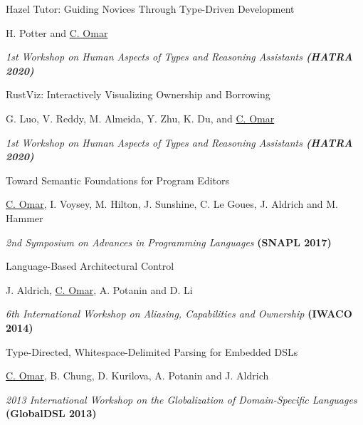 \documentclass[10pt,letterpaper]{article}
\renewenvironment{itemize}{
  \begin{list}{}{
    \setlength{\leftmargin}{1.25em}
    \setlength{\itemsep}{0.25em}
    \setlength{\parskip}{0pt}
    \setlength{\parsep}{0.2em}
  }
}{
  \end{list}
}
\begin{document}
\begin{enumerate}[resume]
\item Hazel Tutor: Guiding Novices Through Type-Driven Development 
  \begin{itemize}
    \item H. Potter and \underline{C. Omar}
    \item \textit{1st Workshop on Human Aspects of Types and Reasoning Assistants \textbf{(HATRA 2020)}}
  \end{itemize}
\item RustViz: Interactively Visualizing Ownership and Borrowing
  \begin{itemize}
    \item G. Luo, V. Reddy, M. Almeida, Y. Zhu, K. Du, and \underline{C. Omar}
    \item \textit{1st Workshop on Human Aspects of Types and Reasoning Assistants \textbf{(HATRA 2020)}}
  \end{itemize}
\item Toward Semantic Foundations for Program Editors
  \begin{itemize}
    \item \underline{C. Omar}, I. Voysey, M. Hilton, J. Sunshine, C. Le Goues, J. Aldrich and M. Hammer
    \item \textit{2nd Symposium on Advances in Programming Languages} {\textbf{(SNAPL 2017)}}
  \end{itemize}
\item Language-Based Architectural Control
  \begin{itemize}
    \item J. Aldrich, \underline{C. Omar}, A. Potanin and D. Li
    \item \textit{6th International Workshop on Aliasing, Capabilities and Ownership} {\textbf{(IWACO 2014)}}
  \end{itemize}
\item Type-Directed, Whitespace-Delimited Parsing for Embedded DSLs
  \begin{itemize}
    \item \underline{C. Omar}, B. Chung, D. Kurilova, A. Potanin and J. Aldrich
    \item \textit{2013 International Workshop on the Globalization of Domain-Specific Languages} {\textbf{(GlobalDSL 2013)}}
  \end{itemize}
\end{enumerate}

\end{document}
